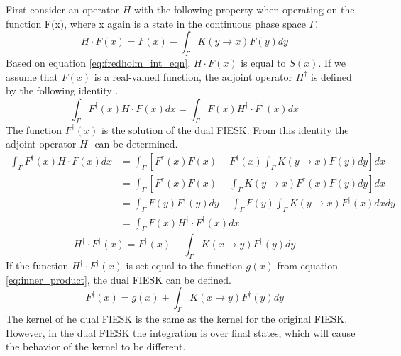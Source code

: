 First consider an operator $H$ with the following property when operating
on the function F(x), where x again is a state in the continuous phase space
$\Gamma$. 
\begin{equation}
  H \cdot F(x) = F(x) - \int_{\Gamma} K(y \to x)F(y)dy
  \label{eq:forward_operator}
\end{equation}
Based on equation \ref{eq:fredholm_int_eqn}, $H \cdot F(x)$ is equal to $S(x)$.
If we assume that $F(x)$ is a real-valued function, the adjoint operator 
$H^{\dagger}$ is defined by the following identity 
\citep{morse_methods_1953}. 
\begin{equation}
  \int_{\Gamma}F^{\dagger}(x)H \cdot F(x)dx  = 
  \int_{\Gamma}F(x)H^{\dagger} \cdot F^{\dagger}(x)dx
  \label{eq:forward_adjoint_ops}
\end{equation}
The function $F^{\dagger}(x)$ is the solution of the dual FIESK. From this 
identity the adjoint operator $H^{\dagger}$ can be determined.
\begin{align}
  \int_{\Gamma} F^{\dagger}(x)H \cdot F(x)dx & = \int_{\Gamma} 
  \left[F^{\dagger}(x)F(x) -
  F^{\dagger}(x)\int_{\Gamma}K(y \to x)F(y)dy \right]dx \nonumber \\
  & = \int_{\Gamma} \left[F^{\dagger}(x)F(x) -
  \int_{\Gamma}K(y \to x)F^{\dagger}(x)F(y)dy \right]dx \nonumber \\
  & = \int_{\Gamma} F(y)F^{\dagger}(y)dy - 
  \int_{\Gamma}F(y)\int_{\Gamma}K(y \to x)F^{\dagger}(x)dxdy \nonumber \\
  & = \int_{\Gamma}F(x)H^{\dagger} \cdot F^{\dagger}(x)dx \nonumber
\end{align}
\begin{equation}
  H^{\dagger} \cdot F^{\dagger}(x) = F^{\dagger}(x) - 
  \int_{\Gamma}K(x \to y)F^{\dagger}(y)dy
  \label{eq:adjoint_operator}
\end{equation}
If the function $H^{\dagger} \cdot F^{\dagger}(x)$ is set equal to the function
$g(x)$ from equation \ref{eq:inner_product}, the dual FIESK can be defined.
\begin{equation}
  F^{\dagger}(x) = g(x) + \int_{\Gamma}K(x \to y)F^{\dagger}(y)dy 
  \label{eq:dual_fredholm_int_eqn}
\end{equation}
The kernel of he dual FIESK is the same as the kernel for the original FIESK. 
However, in the dual FIESK the integration is over final states, which will 
cause the behavior of the kernel to be different.

